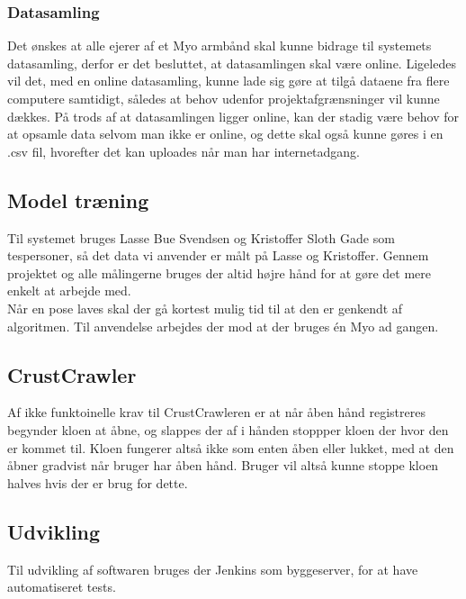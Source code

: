 \subsubsection{Datasamling}
Det ønskes at alle ejerer af et Myo armbånd skal kunne bidrage til systemets datasamling, derfor er det besluttet, at datasamlingen skal være online. Ligeledes vil det, med en online datasamling, kunne lade sig gøre at tilgå dataene fra flere computere samtidigt, således at behov udenfor projektafgrænsninger vil kunne dækkes. På trods af at datasamlingen ligger online, kan der stadig være behov for at opsamle data selvom man ikke er online, og dette skal også kunne gøres i en .csv fil, hvorefter det kan uploades når man har internetadgang.

\subsection*{Model træning}
Til systemet bruges Lasse Bue Svendsen og Kristoffer Sloth Gade som tespersoner, så det data vi anvender er målt på Lasse og Kristoffer. Gennem projektet og alle målingerne bruges der altid højre hånd for at gøre det mere enkelt at arbejde med.\\
Når en pose laves skal der gå kortest mulig tid til at den er genkendt af algoritmen. Til anvendelse arbejdes der mod at der bruges én Myo ad gangen.


\subsection*{CrustCrawler}
Af ikke funktoinelle krav til CrustCrawleren er at når åben hånd registreres begynder kloen at åbne, og slappes der af i hånden stoppper kloen der hvor den er kommet til. Kloen fungerer altså ikke som enten åben eller lukket, med at den åbner gradvist når bruger har åben hånd. Bruger vil altså kunne stoppe kloen halves hvis der er brug for dette.

\subsection*{Udvikling}
Til udvikling af softwaren bruges der Jenkins som byggeserver, for at have automatiseret tests.